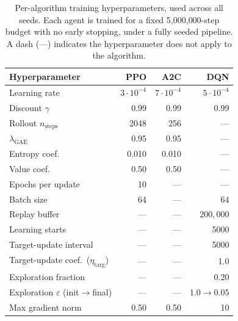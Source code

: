 \begin{table}[!htbp]
\centering
\caption[Per-algorithm training hyperparameters.]{Per-algorithm training hyperparameters, used across all \NumSeeds{} seeds. Each agent is trained for a fixed 5{,}000{,}000-step budget with no early stopping, under a fully seeded pipeline. A dash (---) indicates the hyperparameter does not apply to the algorithm.}
\label{tab:hparams}
\scriptsize
\begin{tabularx}{\textwidth}{Xrrr}
\toprule
Hyperparameter & PPO & A2C & DQN \\
\midrule
Learning rate            & $3\!\cdot\!10^{-4}$ & $7\!\cdot\!10^{-4}$ & $5\!\cdot\!10^{-4}$ \\
Discount $\gamma$        & 0.99  & 0.99  & 0.99 \\
Rollout $n_{\text{steps}}$ & 2048  & 256   & --- \\
$\lambda_{\text{GAE}}$   & 0.95  & 0.95  & --- \\
Entropy coef.            & 0.010 & 0.010 & --- \\
Value coef.              & 0.50  & 0.50  & --- \\
Epochs per update        & 10    & ---   & --- \\
Batch size               & 64    & ---   & 64 \\
Replay buffer            & ---   & ---   & $200{,}000$ \\
Learning starts          & ---   & ---   & 5000 \\
Target-update interval   & ---   & ---   & 5000 \\
Target-update coef.\ ($\eta_{\mathrm{targ}}$) & --- & --- & 1.0 \\
Exploration fraction     & ---   & ---   & 0.20 \\
Exploration $\varepsilon$ (init$\to$final) & --- & --- & $1.0 \to 0.05$ \\
Max gradient norm        & 0.50  & 0.50  & 10 \\
\bottomrule
\end{tabularx}
\end{table}
\par\smallskip{}

